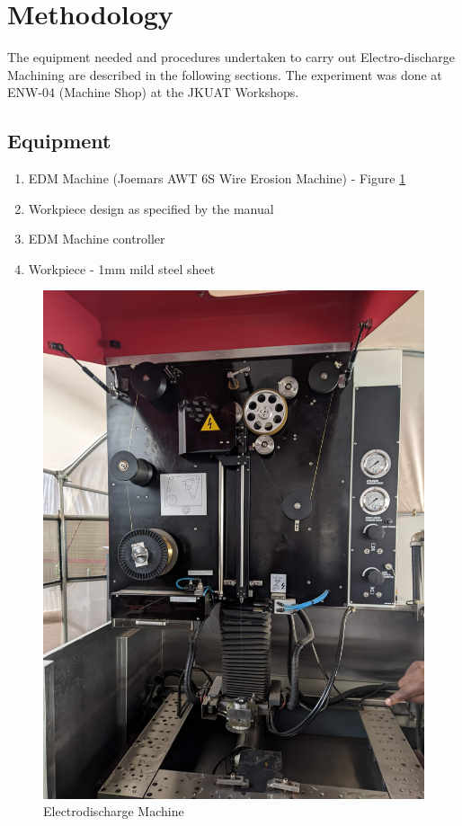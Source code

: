 \section{Methodology}
\lhead{\leftmark}
The equipment needed and procedures undertaken to carry out Electro-discharge Machining are described in the following sections. The experiment was done at ENW-04 (Machine Shop) at the JKUAT Workshops.
\subsection{Equipment}
\begin{enumerate}
\item EDM Machine (Joemars AWT 6S Wire Erosion Machine) - Figure \ref{fig:edmmachine}
\item Workpiece design as specified by the manual
\item EDM Machine controller 
\item Workpiece - 1mm mild steel sheet
\end{enumerate}
\begin{figure}[h!]
	\centering
	\includegraphics[width=0.7\linewidth]{Figures/edmmachine}
	\caption[EDM Machine]{Electrodischarge Machine}
	\label{fig:edmmachine}
\end{figure}
